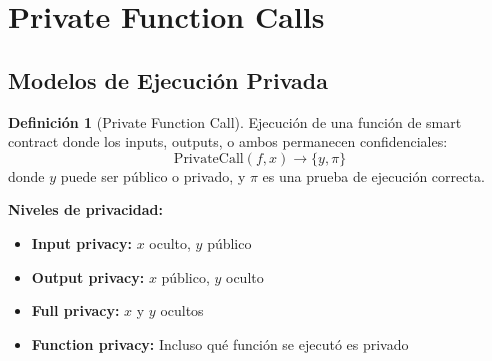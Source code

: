 \documentclass[11pt,a4paper,twoside]{book}
\theoremstyle{definition}
\newtheorem{definition}{Definición}[chapter]
\theoremstyle{remark}
\begin{document}
\section{Private Function Calls}
\label{sec:private-function-calls}

\subsection{Modelos de Ejecución Privada}

\begin{definition}[Private Function Call]
Ejecución de una función de smart contract donde los inputs, outputs, o ambos permanecen confidenciales:
\[
\text{PrivateCall}(f, x) \rightarrow \{y, \pi\}
\]
donde $y$ puede ser público o privado, y $\pi$ es una prueba de ejecución correcta.

\textbf{Niveles de privacidad:}
\begin{itemize}
    \item \textbf{Input privacy:} $x$ oculto, $y$ público
    \item \textbf{Output privacy:} $x$ público, $y$ oculto
    \item \textbf{Full privacy:} $x$ y $y$ ocultos
    \item \textbf{Function privacy:} Incluso qué función se ejecutó es privado
\end{itemize}
\end{definition}
\end{document}
